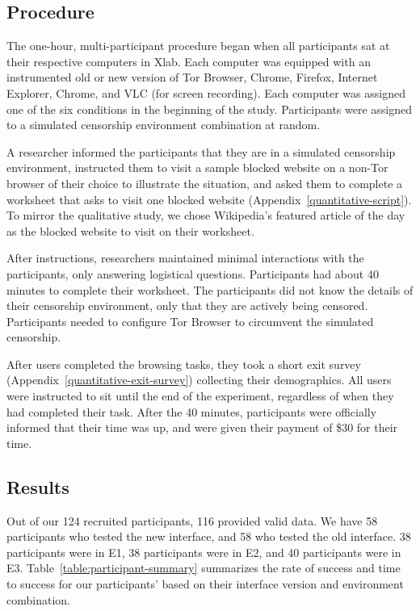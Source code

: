 \documentclass[USenglish,oneside,twocolumn]{article}
\begin{document}
\subsection{Procedure}
The one-hour, multi-participant procedure began when all participants sat at their
respective computers in Xlab. Each computer was equipped with an instrumented old or new version
of Tor Browser, Chrome, Firefox, Internet Explorer,  Chrome, and VLC (for screen recording).
Each computer was assigned one of the six conditions in the beginning of the study. Participants
were assigned to a simulated censorship environment combination at random. 

A researcher informed the participants that they are in a
simulated censorship environment, instructed them to visit a sample blocked website on a 
non-Tor browser of their choice to illustrate the situation, and asked them to 
complete a worksheet that asks to visit one blocked website (Appendix~\ref{quantitative-script}). 
To mirror the qualitative study, we chose Wikipedia's featured article of the day 
as the blocked website to visit on their worksheet. 

After instructions, researchers maintained minimal interactions with the participants, 
only answering logistical questions. Participants had
about 40 minutes to complete their worksheet.
The participants did not know the details of their censorship environment,
only that they are actively being censored. Participants needed to configure Tor Browser to 
circumvent the simulated censorship. 

After users completed the browsing tasks, they took a short exit survey (Appendix~\ref{quantitative-exit-survey})
collecting their demographics. All users were instructed to sit until the end of the experiment,
regardless of when they had completed their task. After the 40 minutes, 
participants were officially informed that their time was up, and were given their payment of 
\$30 for their time. 

\subsection{Results} 
Out of our 124 recruited participants, 116 provided valid data. We have 58 participants who tested the new interface, and 58 who tested the old interface. 38 participants were in E1, 38 participants were in E2, and 40 participants were in E3.
Table~\ref{table:participant-summary} summarizes the rate of success and time to success for our participants' based on their interface version and environment combination. 
\end{document}
